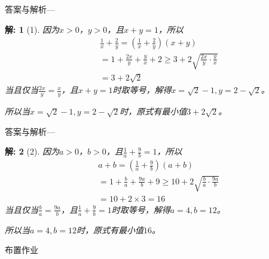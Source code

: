 \documentclass[aspectratio=169,13pt,fleqn] {beamer}
\newtheorem*{solve}{解:}
\begin{document}
\begin{frame}{答案与解析---}
	
	\begin{solve}[1]
	因为$x>0$，$y>0$，且$x+y=1$，所以
	\begin{align*}
		&\frac{1}{x}+\frac{2}{y} = \left(\frac{1}{x} + \frac{2}{y} \right)(x+y)\\
		&=1+\frac{2x}{y} + \frac{y}{x} +2\geqslant 3+2\sqrt{\frac{2x}{y}\cdot\frac{y}{x}}\\
		&=3+2\sqrt{2}
	\end{align*}
	当且仅当$\frac{2x}{y} = \frac{x}{y}$，且$x+y=1$时取等号，解得$x=\sqrt{2}-1,y=2-\sqrt{2}$。
	
	所以当$x=\sqrt{2}-1,y=2-\sqrt{2}$时，原式有最小值$3+2\sqrt{2}$。
	\end{solve}
\end{frame}

\begin{frame}{答案与解析---}
	
	\begin{solve}[2]
		因为$a>0$，$b>0$，且$\frac{1}{a} + \frac{9}{b} =1$，所以
		\begin{align*}
			& a+b= \left(\frac{1}{a} + \frac{9}{b} \right)(a+b)\\
			&=1+\frac{b}{a} + \frac{9a}{b} +9\geqslant 10+2\sqrt{\frac{b}{a}\cdot\frac{9a}{b}}\\
			&=10+2\times 3 =16
		\end{align*}
		当且仅当$\frac{b}{a} = \frac{9a}{b}$，且$\frac{1}{a}+\frac{9}{b}=1$时取等号，解得$a=4,b=12$。
		
		所以当$a=4,b=12$时，原式有最小值$16$。
	\end{solve}
\end{frame}



\begin{frame}{布置作业}

\end{frame}
\end{document}
